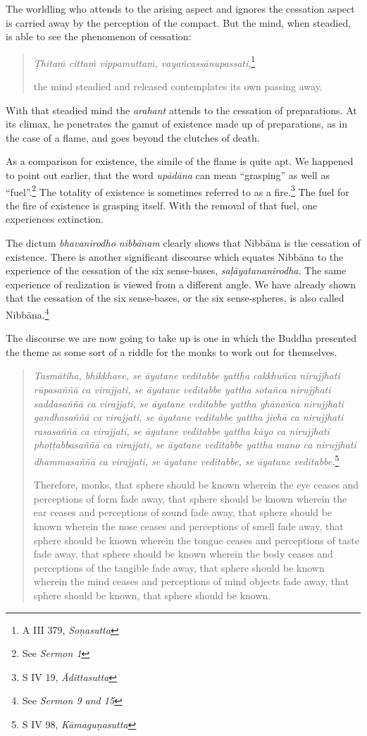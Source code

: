 The worldling who attends to the arising aspect and ignores the cessation aspect is carried away by the perception of the compact. But the mind, when steadied, is able to see the phenomenon of cessation:

\begin{quote}
\emph{Ṭhitaṁ cittaṁ vippamuttaṁ, vayañcassānupassati},\footnote{A III 379, \emph{Soṇasutta}}

the mind steadied and released contemplates its own passing away.
\end{quote}

With that steadied mind the \emph{arahant} attends to the cessation of preparations. At its climax, he penetrates the gamut of existence made up of preparations, as in the case of a flame, and goes beyond the clutches of death.

As a comparison for existence, the simile of the flame is quite apt. We happened to point out earlier, that the word \emph{upādāna} can mean ``grasping'' as well as ``fuel''.\footnote{See \emph{Sermon 1}} The totality of existence is sometimes referred to as a fire.\footnote{S IV 19, \emph{Ādittasutta}} The fuel for the fire of existence is grasping itself. With the removal of that fuel, one experiences extinction.

The dictum \emph{bhavanirodho nibbānam} clearly shows that Nibbāna is the cessation of existence. There is another significant discourse which equates Nibbāna to the experience of the cessation of the six sense-bases, \emph{saḷāyatananirodha}. The same experience of realization is viewed from a different angle. We have already shown that the cessation of the six sense-bases, or the six sense-spheres, is also called Nibbāna.\footnote{See \emph{Sermon 9 and 15}}

The discourse we are now going to take up is one in which the Buddha presented the theme as some sort of a riddle for the monks to work out for themselves.

\begin{quote}
\emph{Tasmātiha, bhikkhave, se āyatane veditabbe yattha cakkhuñca nirujjhati rūpasaññā ca virajjati, se āyatane veditabbe yattha sotañca nirujjhati saddasaññā ca virajjati, se āyatane veditabbe yattha ghānañca nirujjhati gandhasaññā ca virajjati, se āyatane veditabbe yattha jivhā ca nirujjhati rasasaññā ca virajjati, se āyatane veditabbe yattha kāyo ca nirujjhati phoṭṭabbasaññā ca virajjati, se āyatane veditabbe yattha mano ca nirujjhati dhammasaññā ca virajjati, se āyatane veditabbe, se āyatane veditabbe.}\footnote{S IV 98, \emph{Kāmaguṇasutta}}

Therefore, monks, that sphere should be known wherein the eye ceases and perceptions of form fade away, that sphere should be known wherein the ear ceases and perceptions of sound fade away, that sphere should be known wherein the nose ceases and perceptions of smell fade away, that sphere should be known wherein the tongue ceases and perceptions of taste fade away, that sphere should be known wherein the body ceases and perceptions of the tangible fade away, that sphere should be known wherein the mind ceases and perceptions of mind objects fade away, that sphere should be known, that sphere should be known.
\end{quote}

